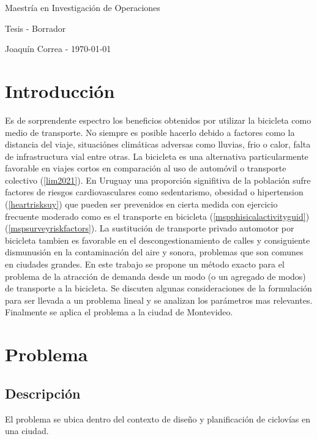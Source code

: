 \documentclass{article}
\begin{document}
  \begin{center}
    {\sc \large Maestría en Investigación de Operaciones}

    {\sc \large Tesis - Borrador}
    \linebreak

    {\rm Joaquín Correa - \today}
  \end{center}

  \section*{Introducción}

  Es de sorprendente espectro los beneficios obtenidos por utilizar la bicicleta como medio de transporte. No siempre es posible hacerlo debido a factores como la distancia del viaje, situaciónes climáticas adversas como lluvias, frio o calor, falta de infrastructura vial entre otras. La bicicleta es una alternativa particularmente favorable en viajes cortos en comparación al uso de automóvil o transporte colectivo (\ref{lim2021}). En Uruguay una proporción signifitiva de la población sufre factores de riesgos cardiovasculares como sedentarismo, obesidad o hipertension (\ref{heartrisksuy}) que pueden ser prevenidos en cierta medida con ejercicio frecuente moderado como es el transporte en bicicleta (\ref{mspphisicalactivityguid}) (\ref{mspsurveyriskfactors}). La sustitución de transporte privado automotor por bicicleta tambien es favorable en el descongestionamiento de calles y consiguiente dismunusión en la contaminación del aire y sonora, problemas que son comunes en ciudades grandes. En este trabajo se propone un método exacto para el problema de la atracción de demanda desde un modo (o un agregado de modos) de transporte a la bicicleta. Se discuten algunas consideraciones de la formulación para ser llevada a un problema lineal y se analizan los parámetros mas relevantes. Finalmente se aplica el problema a la ciudad de Montevideo.

  \section*{Problema}

  \subsection*{Descripción}

  El problema se ubica dentro del contexto de diseño y planificación de ciclovías en una ciudad.
\end{document}
